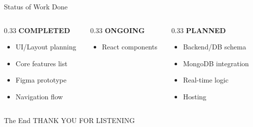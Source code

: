 \documentclass{beamer}
\begin{document}
\begin{frame}{Status of Work Done}
    \begin{columns}[t]
        \begin{column}{0.33\textwidth}
            \textbf{\color{green}COMPLETED}
            \begin{itemize}
                \scriptsize
                \item UI/Layout planning
                \item Core features list
                \item Figma prototype
                \item Navigation flow
            \end{itemize}
        \end{column}
        \begin{column}{0.33\textwidth}
            \textbf{\color{yellow}ONGOING}
            \begin{itemize}
                \scriptsize
                \item React components
            \end{itemize}
        \end{column}
        \begin{column}{0.33\textwidth}
            \textbf{\color{TypeShiftPurple}PLANNED}
            \begin{itemize}
                \scriptsize
                \item Backend/DB schema
                \item MongoDB integration
                \item Real-time logic
                \item Hosting
            \end{itemize}
        \end{column}
    \end{columns}
\end{frame}

\begin{frame}
    \centering
    \Huge \color{TypeShiftPurple} The End
    \vfill
    \large THANK YOU FOR LISTENING
\end{frame}
\end{document}
